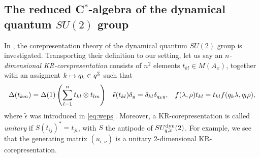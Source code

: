 




\subsection{The reduced C$^*$-algebra of the dynamical quantum $SU(2)$ group}



In \cite{KoR1}, the corepresentation theory of the dynamical quantum $SU(2)$ group is investigated. Transporting their definition to our setting, let us say an \emph{$n$-dimensional KR-corepresentation} consists of $n^2$ elements $t_{kl} \in M(A_x)$, together with an assigment $k \mapsto q_k \in q^{\mathbb{Z}}$ such that \begin{align*} \Delta(t_{km}) = \Delta(1)\left(\sum_{l=1}^n t_{kl}\otimes t_{lm}\right)&& \operatorname{\tilde{\epsilon}}(t_{kl})\delta_y = \delta_{kl} \delta_{q_ky},&& f(\lambda,\rho)t_{kl} = t_{kl}f(q_k\lambda,q_l\rho),\end{align*} where $\widetilde{\epsilon}$ was introduced in \eqref{eq:weps}. Moreover, a KR-corepresentation is called \emph{unitary} if $S(t_{ij})^* =t_{ji}$, with $S$ the antipode of $SU_{q,x}^{\operatorname{\mathrm{dyn}}}(2)$. For example, we see that the generating matrix $(u_{\epsilon,\nu})$ is a unitary 2-dimensional KR-corepresentation.  

